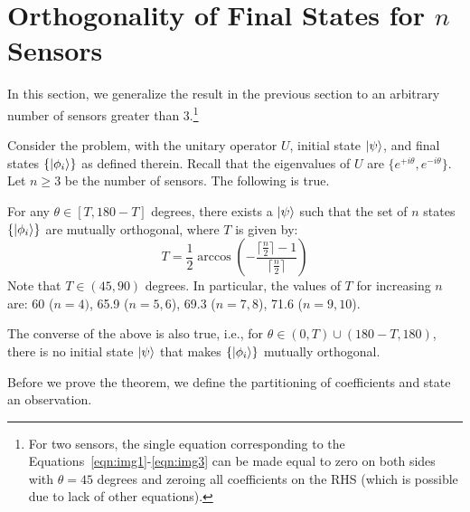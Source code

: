 \section{Orthogonality of Final States for $n$ Sensors}
\label{sec:n-ortho}

In this section, we generalize the result in the previous section to an arbitrary number of sensors greater than 3.\footnote{For two sensors, the single equation corresponding to the Equations~\ref{eqn:img1}-\ref{eqn:img3} can be made equal to zero on both sides with $\theta=45$ degrees and zeroing all coefficients on the RHS (which is possible due to lack of other equations).}

\begin{theorem}
Consider the \iso problem, with the unitary operator $U$, initial state $\ket{\psi}$,
and final states $\{\ket{\phi_i}\}$ as defined therein. Recall that the eigenvalues of
$U$ are $\{e^{+i\theta}, e^{-i\theta}\}$. Let $n \geq 3$ be the number of sensors. The following is true.

For any $\theta \in [T, 180-T]$ degrees, there exists a $\ket{\psi}$ such that the set of $n$ states $\{\ket{\phi_i}\}$ are mutually orthogonal, where $T$ is given by:
$$T = \frac{1}{2}\arccos{\left(-\frac{\lceil \frac{n}{2} \rceil - 1}{\lceil \frac{n}{2} \rceil}\right)}$$
Note that $T \in (45, 90)$ degrees. In particular, the values of $T$ for increasing $n$ are:  60 ($n=4)$, 65.9 ($n=5,6$), 69.3 ($n=7,8$), 71.6 ($n=9,10$).

The converse of the above is also true, i.e., 
for $\theta \in (0, T) \cup (180-T, 180)$, there is
no initial state $\ket{\psi}$  that makes $\{\ket{\phi_i}\}$  mutually orthogonal. 
\label{thm:nsensors}
\end{theorem}
    

\medskip
Before we prove the theorem, we define the partitioning of coefficients and state an observation.


